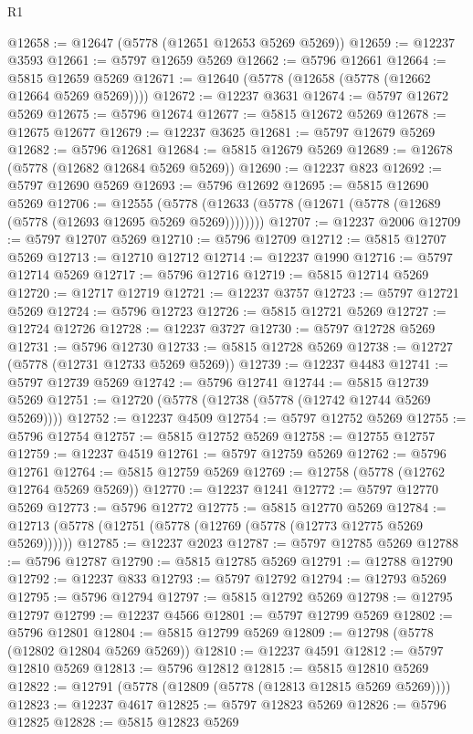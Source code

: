 \begin{lexlean}{R1}
\begin{coremodule}
@12658 := @12647 (@5778 (@12651 @12653 @5269 @5269))
@12659 := @12237 @3593
@12661 := @5797 @12659 @5269
@12662 := @5796 @12661
@12664 := @5815 @12659 @5269
@12671 := @12640 (@5778 (@12658 (@5778 (@12662 @12664 @5269 @5269))))
@12672 := @12237 @3631
@12674 := @5797 @12672 @5269
@12675 := @5796 @12674
@12677 := @5815 @12672 @5269
@12678 := @12675 @12677
@12679 := @12237 @3625
@12681 := @5797 @12679 @5269
@12682 := @5796 @12681
@12684 := @5815 @12679 @5269
@12689 := @12678 (@5778 (@12682 @12684 @5269 @5269))
@12690 := @12237 @823
@12692 := @5797 @12690 @5269
@12693 := @5796 @12692
@12695 := @5815 @12690 @5269
@12706 := @12555
    (@5778 (@12633 (@5778 (@12671 (@5778 (@12689 (@5778 (@12693 @12695 @5269 @5269))))))))
@12707 := @12237 @2006
@12709 := @5797 @12707 @5269
@12710 := @5796 @12709
@12712 := @5815 @12707 @5269
@12713 := @12710 @12712
@12714 := @12237 @1990
@12716 := @5797 @12714 @5269
@12717 := @5796 @12716
@12719 := @5815 @12714 @5269
@12720 := @12717 @12719
@12721 := @12237 @3757
@12723 := @5797 @12721 @5269
@12724 := @5796 @12723
@12726 := @5815 @12721 @5269
@12727 := @12724 @12726
@12728 := @12237 @3727
@12730 := @5797 @12728 @5269
@12731 := @5796 @12730
@12733 := @5815 @12728 @5269
@12738 := @12727 (@5778 (@12731 @12733 @5269 @5269))
@12739 := @12237 @4483
@12741 := @5797 @12739 @5269
@12742 := @5796 @12741
@12744 := @5815 @12739 @5269
@12751 := @12720 (@5778 (@12738 (@5778 (@12742 @12744 @5269 @5269))))
@12752 := @12237 @4509
@12754 := @5797 @12752 @5269
@12755 := @5796 @12754
@12757 := @5815 @12752 @5269
@12758 := @12755 @12757
@12759 := @12237 @4519
@12761 := @5797 @12759 @5269
@12762 := @5796 @12761
@12764 := @5815 @12759 @5269
@12769 := @12758 (@5778 (@12762 @12764 @5269 @5269))
@12770 := @12237 @1241
@12772 := @5797 @12770 @5269
@12773 := @5796 @12772
@12775 := @5815 @12770 @5269
@12784 := @12713 (@5778 (@12751 (@5778 (@12769 (@5778 (@12773 @12775 @5269 @5269))))))
@12785 := @12237 @2023
@12787 := @5797 @12785 @5269
@12788 := @5796 @12787
@12790 := @5815 @12785 @5269
@12791 := @12788 @12790
@12792 := @12237 @833
@12793 := @5797 @12792
@12794 := @12793 @5269
@12795 := @5796 @12794
@12797 := @5815 @12792 @5269
@12798 := @12795 @12797
@12799 := @12237 @4566
@12801 := @5797 @12799 @5269
@12802 := @5796 @12801
@12804 := @5815 @12799 @5269
@12809 := @12798 (@5778 (@12802 @12804 @5269 @5269))
@12810 := @12237 @4591
@12812 := @5797 @12810 @5269
@12813 := @5796 @12812
@12815 := @5815 @12810 @5269
@12822 := @12791 (@5778 (@12809 (@5778 (@12813 @12815 @5269 @5269))))
@12823 := @12237 @4617
@12825 := @5797 @12823 @5269
@12826 := @5796 @12825
@12828 := @5815 @12823 @5269

\end{coremodule}
\end{lexlean}
